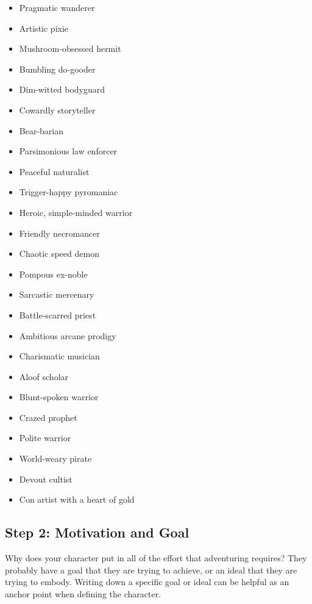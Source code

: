         \begin{itemize}
            \item Pragmatic wanderer
            \item Artistic pixie
            \item Mushroom-obsessed hermit
            \item Bumbling do-gooder
            \item Dim-witted bodyguard
            \item Cowardly storyteller
            \item Bear-barian
            \item Parsimonious law enforcer
            \item Peaceful naturalist
            \item Trigger-happy pyromaniac
            \item Heroic, simple-minded warrior
            \item Friendly necromancer
            \item Chaotic speed demon
            \item Pompous ex-noble
            \item Sarcastic mercenary
            \item Battle-scarred priest
            \item Ambitious arcane prodigy
            \item Charismatic musician
            \item Aloof scholar
            \item Blunt-spoken warrior
            \item Crazed prophet
            \item Polite warrior
            \item World-weary pirate
            \item Devout cultist
            \item Con artist with a heart of gold
        \end{itemize}

    \subsection{Step 2: Motivation and Goal}
        Why does your character put in all of the effort that adventuring requires?
        They probably have a goal that they are trying to achieve, or an ideal that they are trying to embody.
        Writing down a specific goal or ideal can be helpful as an anchor point when defining the character.

